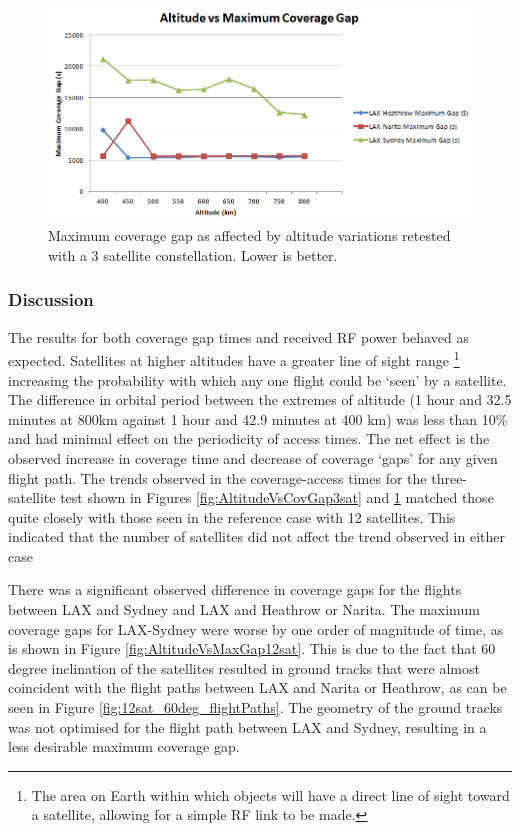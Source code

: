 \begin{figure}[htbp]
	\centering
	\includegraphics[scale = 0.6]{Pictures/AltitudeVsMaxGap3sat.png}
	
	\caption{Maximum coverage gap as affected by altitude variations retested with a 3 satellite constellation. Lower is better. }
	\label{fig:AltitudeVsMaxGap3sat}
\end{figure} 

\subsubsection{Discussion}
The results for both coverage gap times and received RF power behaved as expected. Satellites at higher altitudes have a greater line of sight range \footnote{The area on Earth within which objects will have a direct line of sight toward a satellite, allowing for a simple RF link to be made.} increasing the probability with which any one flight could be `seen' by a satellite. The difference in orbital period between the extremes of altitude (1 hour and 32.5 minutes at 800km against 1 hour and 42.9 minutes at 400 km) was less than 10\% and had minimal effect on the periodicity of access times. The net effect is the observed increase in coverage time and decrease of coverage `gaps' for any given flight path. The trends observed in the coverage-access times for the three-satellite test shown in Figures \ref{fig:AltitudeVsCovGap3sat} and \ref{fig:AltitudeVsMaxGap3sat} matched those quite closely with those seen in the reference case with 12 satellites. This indicated that the number of satellites did not affect the trend observed in either case

There was a significant observed difference in coverage gaps for the flights between LAX and Sydney and LAX and Heathrow or Narita. The maximum coverage gaps for LAX-Sydney were worse by one order of magnitude of time, as is shown in Figure \ref{fig:AltitudeVsMaxGap12sat}. This is due to the fact that 60 degree inclination of the satellites resulted in ground tracks that were almost coincident with the flight paths between LAX and Narita or Heathrow, as can be seen in Figure \ref{fig:12sat_60deg_flightPaths}. The geometry of the ground tracks was not optimised for the flight path between LAX and Sydney, resulting in a less desirable maximum coverage gap.

